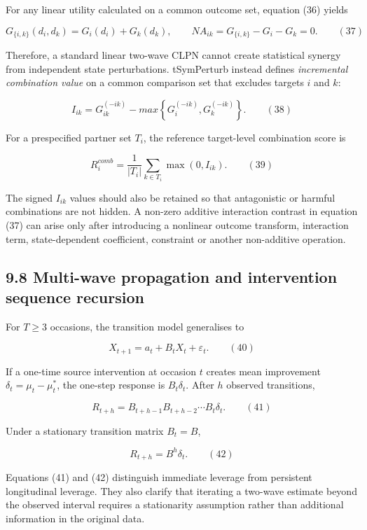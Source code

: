 \documentclass[11pt]{article}
\begin{document}
For any linear utility calculated on a common outcome set, equation (36)
yields

\[G_{\{ i,k\}}\left( d_{i},d_{k} \right) = G_{i}\left( d_{i} \right) + G_{k}\left( d_{k} \right),\quad\quad NA_{ik} = G_{\{ i,k\}} - G_{i} - G_{k} = 0.\quad\quad(37)\]

Therefore, a standard linear two-wave CLPN cannot create statistical
synergy from independent state perturbations. tSymPerturb instead
defines \emph{incremental combination value} on a common comparison set
that excludes targets \(i\) and \(k\):

\[I_{ik} = G_{ik}^{( - ik)} - max\left\{ G_{i}^{( - ik)},G_{k}^{( - ik)} \right\}.\quad\quad(38)\]

For a prespecified partner set \(T_{i}\), the reference target-level
combination score is

\[R_{i}^{comb} = \frac{1}{\left| T_{i} \right|}\sum_{k \in T_{i}}^{}\max\left( 0,I_{ik} \right).\quad\quad(39)\]

The signed \(I_{ik}\) values should also be retained so that
antagonistic or harmful combinations are not hidden. A non-zero additive
interaction contrast in equation (37) can arise only after introducing a
nonlinear outcome transform, interaction term, state-dependent
coefficient, constraint or another non-additive operation.

\subsection{9.8 Multi-wave propagation and intervention sequence
recursion}\label{multi-wave-propagation-and-intervention-sequence-recursion}

For \(T \geq 3\) occasions, the transition model generalises to

\[X_{t + 1} = a_{t} + B_{t}X_{t} + \varepsilon_{t}.\quad\quad(40)\]

If a one-time source intervention at occasion \(t\) creates mean
improvement \(\delta_{t} = \mu_{t} - \mu_{t}^{\ast}\), the one-step
response is \(B_{t}\delta_{t}\). After \(h\) observed transitions,

\[R_{t + h} = B_{t + h - 1}B_{t + h - 2}\cdots B_{t}\delta_{t}.\quad\quad(41)\]

Under a stationary transition matrix \(B_{t} = B\),

\[R_{t + h} = B^{h}\delta_{t}.\quad\quad(42)\]

Equations (41) and (42) distinguish immediate leverage from persistent
longitudinal leverage. They also clarify that iterating a two-wave
estimate beyond the observed interval requires a stationarity assumption
rather than additional information in the original data.
\end{document}
